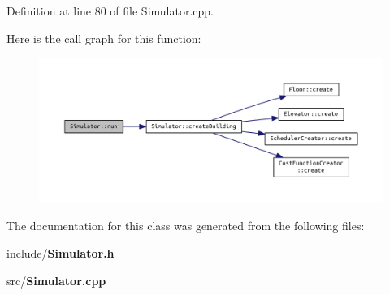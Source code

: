Definition at line 80 of file Simulator.\+cpp.



Here is the call graph for this function\+:
\nopagebreak
\begin{figure}[H]
\begin{center}
\leavevmode
\includegraphics[width=350pt]{class_simulator_aa2de7e32b04cc3e8fc60aec23997621b_cgraph}
\end{center}
\end{figure}




The documentation for this class was generated from the following files\+:\begin{DoxyCompactItemize}
\item 
include/{\bf Simulator.\+h}\item 
src/{\bf Simulator.\+cpp}\end{DoxyCompactItemize}
